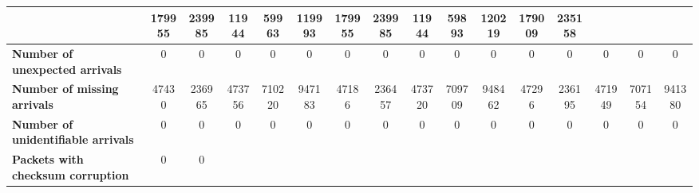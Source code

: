 \begin{table}[!h]
{\begin{tabular}{|l|ccccc|ccccc|ccccc|}
            & \multicolumn{1}{c|}{179955}
            & \multicolumn{1}{c|}{239985}
            & \multicolumn{1}{c|}{11944}
            & \multicolumn{1}{c|}{59963}
            & \multicolumn{1}{c|}{119993}
            & \multicolumn{1}{c|}{179955}
            & \multicolumn{1}{c|}{239985}
            & \multicolumn{1}{c|}{11944}
            & \multicolumn{1}{c|}{59893}
            & \multicolumn{1}{c|}{120219}
            & \multicolumn{1}{c|}{179009}
            & \multicolumn{1}{c|}{235158}
            \\ \hline
            \textbf{Number of unexpected arrivals} & \multicolumn{1}{c|}{0} & \multicolumn{1}{c|}{0}
            & \multicolumn{1}{c|}{0}
            & \multicolumn{1}{c|}{0}
            & \multicolumn{1}{c|}{0}
            & \multicolumn{1}{c|}{0}
            & \multicolumn{1}{c|}{0}
            & \multicolumn{1}{c|}{0}
            & \multicolumn{1}{c|}{0}
            & \multicolumn{1}{c|}{0}
            & \multicolumn{1}{c|}{0}
            & \multicolumn{1}{c|}{0}
            & \multicolumn{1}{c|}{0}
            & \multicolumn{1}{c|}{0}
            & \multicolumn{1}{c|}{0}
            \\ \hline
            \textbf{Number of missing arrivals} & \multicolumn{1}{c|}{47430} & \multicolumn{1}{c|}{236965}
            & \multicolumn{1}{c|}{473756}
            & \multicolumn{1}{c|}{710220}
            & \multicolumn{1}{c|}{947183}
            & \multicolumn{1}{c|}{47186}
            & \multicolumn{1}{c|}{236457}
            & \multicolumn{1}{c|}{473720}
            & \multicolumn{1}{c|}{709709}
            & \multicolumn{1}{c|}{948462}
            & \multicolumn{1}{c|}{47296}
            & \multicolumn{1}{c|}{236195}
            & \multicolumn{1}{c|}{471949}
            & \multicolumn{1}{c|}{707154}
            & \multicolumn{1}{c|}{941380}
            \\ \hline
            \textbf{Number of unidentifiable arrivals} & \multicolumn{1}{c|}{0} & \multicolumn{1}{c|}{0}
            & \multicolumn{1}{c|}{0}
            & \multicolumn{1}{c|}{0}
            & \multicolumn{1}{c|}{0}
            & \multicolumn{1}{c|}{0}
            & \multicolumn{1}{c|}{0}
            & \multicolumn{1}{c|}{0}
            & \multicolumn{1}{c|}{0}
            & \multicolumn{1}{c|}{0}
            & \multicolumn{1}{c|}{0}
            & \multicolumn{1}{c|}{0}
            & \multicolumn{1}{c|}{0}
            & \multicolumn{1}{c|}{0}
            & \multicolumn{1}{c|}{0}
            \\ \hline
            \textbf{Packets with checksum corruption} & \multicolumn{1}{c|}{0} & \multicolumn{1}{c|}{0}

\end{tabular}}
\end{table}
